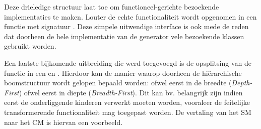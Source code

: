 Deze drieledige structuur laat toe om functioneel-gerichte bezoekende
implementaties te maken. Louter de echte functionaliteit wordt opgenomen in een
functie met signatuur . Deze simpele uitwendige interface
is ook mede de reden dat doorheen de hele implementatie van de generator vele
bezoekende klassen gebruikt worden.

Een laatste bijkomende uitbreiding die werd toegevoegd is de opsplitsing van de
-functie in een  en
. Hierdoor kan de manier waarop doorheen de
hi\"erarchische boomstructuur wordt gelopen bepaald worden: ofwel eerst in de
breedte (\emph{Depth-First}) ofwel eerst in diepte (\emph{Breadth-First}). Dit
kan bv. belangrijk zijn indien eerst de onderliggende kinderen verwerkt moeten
worden, vooraleer de feitelijke transformerende functionaliteit mag toegepast
worden. De vertaling van het SM naar het CM is hiervan een voorbeeld.
